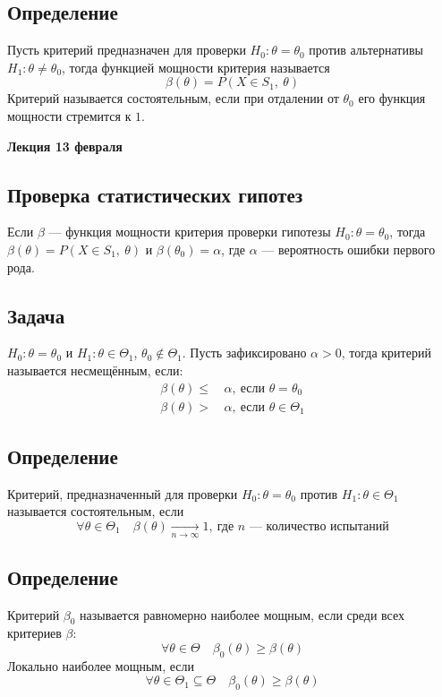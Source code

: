 \documentclass[12pt, a4paper]{article}
\begin{document}
\subsection*{Определение}
Пусть критерий предназначен для проверки $H_0: \theta = \theta_0$ против альтернативы $H_1: \theta \neq \theta_0$, тогда функцией мощности критерия называется
\[\beta(\theta) = P(X \in S_1,\ \theta)\]
Критерий называется состоятельным, если при отдалении от $\theta_0$ его функция мощности стремится к $1$.
\begin{center}
    \bf Лекция 13 февраля
\end{center}
\subsection*{Проверка статистических гипотез}
Если $\beta$ --- функция мощности критерия проверки гипотезы $H_0: \theta = \theta_0$, тогда $\beta(\theta) = P(X\in S_1,\ \theta)$ и $\beta(\theta_0) = \alpha$, где $\alpha$ --- вероятность ошибки первого рода.
\subsection*{Задача}
$H_0: \theta = \theta_0$ и $H_1: \theta \in \Theta_1$, $\theta_0 \notin \Theta_1$. Пусть зафиксировано $\alpha > 0$, тогда критерий называется несмещённым, если:
\begin{equation*}
    \begin{aligned}
        \beta(\theta) \leq&\, \alpha,\ \text{если }\theta =  \theta_0\\
        \beta(\theta) >&\, \alpha,\ \text{если } \theta \in \Theta_1
    \end{aligned}
\end{equation*}
\subsection*{Определение}
Критерий, предназначенный для проверки $H_0: \theta = \theta_0$ против $H_1: \theta \in \Theta_1$ называется состоятельным, если
\[\forall \theta \in \Theta_1 \quad \beta (\theta) \xrightarrow[n\to\infty]{} 1,\ \text{где $n$ --- количество испытаний}\]
\subsection*{Определение}
Критерий $\beta_0$ называется равномерно наиболее мощным, если среди всех критериев $\beta$:
\[\forall \theta \in \Theta \quad \beta_0(\theta) \geq \beta(\theta)\]
Локально наиболее мощным, если
\[\forall \theta \in \Theta_1 \subseteq \Theta \quad \beta_0(\theta) \geq \beta(\theta)\]
\end{document}
